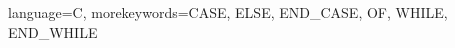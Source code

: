  {
    language=C,
    morekeywords={CASE, ELSE, END_CASE, OF, WHILE, END_WHILE}
}

\newcommand{\ST}[3]{
    \kodeprintstyle{#1}{#2}{#3}{ST}{Structured Text}
}